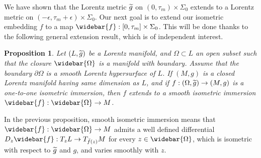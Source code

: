\documentclass[11pt]{article}
\newtheorem{prop}[theo]{Proposition}
\theoremstyle{definition}
\numberwithin{equation}{section}
\numberwithin{figure}{section}
\numberwithin{table}{section}
\let\oldtilde\tilde
\renewcommand*\tilde[1]{\mathchoice{\widetilde{#1}}{\widetilde{#1}}{\widetilde{#1}}{\oldtilde{#1}}}
\let\oldbar\bar
\renewcommand*{\bar}[1]{\mathchoice{\widebar{#1}}{\widebar{#1}}{\oldbar{#1}}{\oldbar{#1}}}
\renewcommand*{\overline}{\bar}
\begin{document}
We have shown that the Lorentz metric $\tilde{g}$ on $(0,\tau_m) \times \Sigma_0$ extends to a Lorentz metric on $(-\epsilon, \tau_m+\epsilon) \times \Sigma_0$. Our next goal is to extend our isometric embedding $f$ to a map $\overline{f}: [0,\tau_m] \times \Sigma_0$. This will be done thanks to the following general extension result, which is of independent interest.


\begin{prop}\label{prop.extension}
Let $(L,\tilde{g})$ be a Lorentz manifold, and $\Omega \subset L$ an open subset such that the closure $\overline{\Omega}$ is a manifold with boundary. Assume that the boundary $\partial \Omega$ is a smooth Lorentz hypersurface of $L$. If $(M,g)$ is a closed Lorentz manifold having same dimension as $L$, and if $f: (\Omega,\tilde{g}) \to (M,g)$ is a one-to-one isometric immersion, then $f$ extends to a smooth isometric immersion $\overline{f} : \overline{ \Omega} \to M$.
\end{prop}

In the previous proposition, smooth isometric immersion means that $\overline{f}: \overline{\Omega} \to M$ admits a well defined differential $D_z{\overline{f}}: T_zL \to T_{\overline{f}(z)}M$ for every $z \in \overline{\Omega}$, which is isometric with respect to $\tilde{g}$ and $g$, and varies smoothly with $z$.
\end{document}
